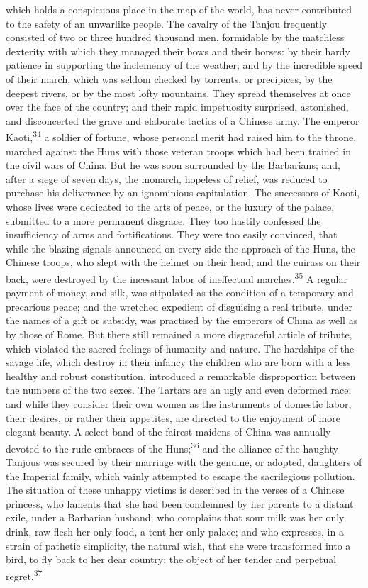 which holds a conspicuous place in the map of the world, has
never contributed to the safety of an unwarlike people. The
cavalry of the Tanjou frequently consisted of two or three
hundred thousand men, formidable by the matchless dexterity with
which they managed their bows and their horses: by their hardy
patience in supporting the inclemency of the weather; and by the
incredible speed of their march, which was seldom checked by
torrents, or precipices, by the deepest rivers, or by the most
lofty mountains. They spread themselves at once over the face of
the country; and their rapid impetuosity surprised, astonished,
and disconcerted the grave and elaborate tactics of a Chinese
army. The emperor Kaoti,\textsuperscript{34} a soldier of fortune, whose personal
merit had raised him to the throne, marched against the Huns with
those veteran troops which had been trained in the civil wars of
China. But he was soon surrounded by the Barbarians; and, after a
siege of seven days, the monarch, hopeless of relief, was reduced
to purchase his deliverance by an ignominious capitulation. The
successors of Kaoti, whose lives were dedicated to the arts of
peace, or the luxury of the palace, submitted to a more permanent
disgrace. They too hastily confessed the insufficiency of arms
and fortifications. They were too easily convinced, that while
the blazing signals announced on every side the approach of the
Huns, the Chinese troops, who slept with the helmet on their
head, and the cuirass on their back, were destroyed by the
incessant labor of ineffectual marches.\textsuperscript{35} A regular payment of
money, and silk, was stipulated as the condition of a temporary
and precarious peace; and the wretched expedient of disguising a
real tribute, under the names of a gift or subsidy, was practised
by the emperors of China as well as by those of Rome. But there
still remained a more disgraceful article of tribute, which
violated the sacred feelings of humanity and nature. The
hardships of the savage life, which destroy in their infancy the
children who are born with a less healthy and robust
constitution, introduced a remarkable disproportion between the
numbers of the two sexes. The Tartars are an ugly and even
deformed race; and while they consider their own women as the
instruments of domestic labor, their desires, or rather their
appetites, are directed to the enjoyment of more elegant beauty.
A select band of the fairest maidens of China was annually
devoted to the rude embraces of the Huns;\textsuperscript{36} and the alliance of
the haughty Tanjous was secured by their marriage with the
genuine, or adopted, daughters of the Imperial family, which
vainly attempted to escape the sacrilegious pollution. The
situation of these unhappy victims is described in the verses of
a Chinese princess, who laments that she had been condemned by
her parents to a distant exile, under a Barbarian husband; who
complains that sour milk was her only drink, raw flesh her only
food, a tent her only palace; and who expresses, in a strain of
pathetic simplicity, the natural wish, that she were transformed
into a bird, to fly back to her dear country; the object of her
tender and perpetual regret.\textsuperscript{37}

